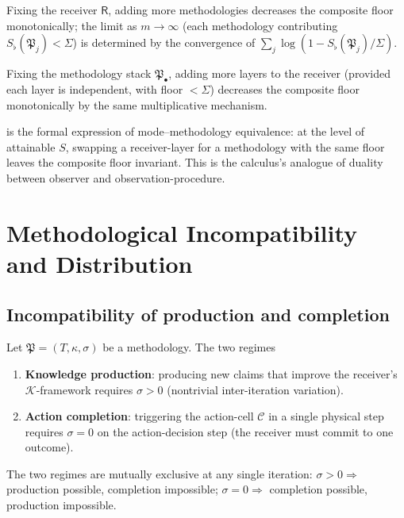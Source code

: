 \documentclass[twocolumn,11pt,a4paper]{article}
\newcommand{\K}{\mathcal{K}}
\newcommand{\Cell}{\mathcal{C}}
\newcommand{\Method}{\mathfrak{P}}
\newcommand{\receiver}{\mathsf{R}}
\newcommand{\Sfloor}{S_{\flat}}
\begin{document}
\begin{corollary}\label{cor:method-only}
Fixing the receiver $\receiver$, adding more methodologies decreases the
composite floor monotonically; the limit as $m\to\infty$ (each
methodology contributing $\Sfloor(\Method_j)<\Sigma$) is determined by
the convergence of $\sum_j\log(1-\Sfloor(\Method_j)/\Sigma)$.
\end{corollary}

\begin{corollary}\label{cor:receiver-only}
Fixing the methodology stack $\Method_\bullet$, adding more layers to the
receiver (provided each layer is independent, with floor $<\Sigma$)
decreases the composite floor monotonically by the same multiplicative
mechanism.
\end{corollary}

\begin{remark}[Symmetry in $\receiver$ and $\Method$]\label{rem:symmetry}
 is the formal expression of mode--methodology
equivalence: at the level of attainable $S$, swapping a receiver-layer
for a methodology with the same floor leaves the composite floor invariant.
This is the calculus's analogue of duality between observer and
observation-procedure.
\end{remark}

\section{Methodological Incompatibility and Distribution}
\label{sec:incompatibility}

\subsection{Incompatibility of production and completion}

\begin{theorem}
\label{thm:incompat}
Let $\Method=(T,\kappa,\sigma)$ be a methodology. The two regimes
\begin{enumerate}[label=(\Roman*),leftmargin=*]
\item \textbf{Knowledge production}: producing new claims that improve
the receiver's $\K$-framework requires $\sigma>0$ (nontrivial
inter-iteration variation).
\item \textbf{Action completion}: triggering the action-cell $\Cell$ in a
single physical step requires $\sigma=0$ on the action-decision step
(the receiver must commit to one outcome).
\end{enumerate}
The two regimes are mutually exclusive at any single iteration:
$\sigma>0\Rightarrow$ production possible, completion impossible;
$\sigma=0\Rightarrow$ completion possible, production impossible.
\end{theorem}
\end{document}
